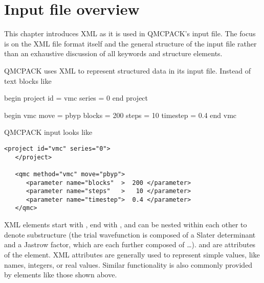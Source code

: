 \chapter{Input file overview}
\label{chap:input_overview}

This chapter introduces XML as it is used in QMCPACK's input file.  The focus is on the XML file format itself and the general structure of the input file rather than an exhaustive discussion of all keywords and structure elements.  

QMCPACK uses XML to represent structured data in its input file.  Instead of text blocks like

\begin{shade}
begin project
  id     = vmc
  series = 0
end project

begin vmc
  move     = pbyp
  blocks   = 200
  steps    =  10
  timestep = 0.4
end vmc
\end{shade} 
QMCPACK input looks like
\begin{lstlisting}[style=QMCPXML]
   <project id="vmc" series="0">
   </project>

   <qmc method="vmc" move="pbyp">
      <parameter name="blocks"  >  200 </parameter>
      <parameter name="steps"   >   10 </parameter>
      <parameter name="timestep">  0.4 </parameter>
   </qmc>
\end{lstlisting}
XML elements start with , end with , and can be nested within each other to denote substructure (the trial wavefunction is composed of a Slater determinant and a Jastrow factor, which are each further composed of \ldots).   and  are attributes of the  element.  XML attributes are generally used to represent simple values, like names, integers, or real values.  Similar functionality is also commonly provided by  elements like those shown above.

